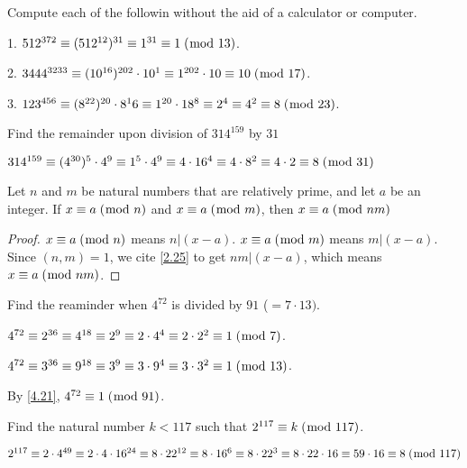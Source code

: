 \documentclass[../main.tex]{subfiles}
\begin{document}
\begin{ex} \label{4.19}
  Compute each of the followin without the aid of a calculator or computer.
\end{ex}

1. $512^{372} \equiv (512^{12})^{31} \equiv 1^{31} \equiv 1 \; (\bmod \; 13)$.

2. $3444^{3233} \equiv (10^{16})^{202} \cdot 10^1 \equiv 1^{202} \cdot 10 \equiv 10 \; (\bmod \; 17)$.

3. $123^{456} \equiv (8^{22})^{20} \cdot 8^16 \equiv 1^{20} \cdot 18^8 \equiv 2^4 \equiv 4^2 \equiv 8 \; (\bmod \; 23)$.



\begin{ex} \label{4.20}
  Find the remainder upon division of $314^{159}$ by $31$
\end{ex}

$314^{159} \equiv (4^{30})^5 \cdot 4^9 \equiv 1^5 \cdot 4^9 \equiv 4 \cdot 16^4 \equiv 4 \cdot 8^2 \equiv 4 \cdot 2 \equiv 8 \; (\bmod \; 31)$



\begin{thm} \label{4.21}
  Let $n$ and $m$ be natural numbers that are relatively prime, and let $a$ be an integer. If $x \equiv a \; (\bmod \; n)$ and $x \equiv a \; (\bmod \; m)$, then $x \equiv a \; (\bmod \; nm)$
\end{thm}

\begin{proof}
  $x \equiv a \; (\bmod \; n)$ means $n | (x-a)$. $x \equiv a \; (\bmod \; m)$ means $m | (x-a)$. Since $(n, m) = 1$, we cite \ref{2.25} to get $nm | (x-a)$, which means $x \equiv a \; (\bmod \; nm)$.
\end{proof}



\begin{ex} \label{4.22}
  Find the reaminder when $4^{72}$ is divided by $91$ ($= 7 \cdot 13)$.
\end{ex}

$4^{72} \equiv 2^{36} \equiv 4^{18} \equiv 2^9 \equiv 2 \cdot 4^4 \equiv 2 \cdot 2^2 \equiv 1 \; (\bmod \; 7)$.

$4^{72} \equiv 3^{36} \equiv 9^{18} \equiv 3^9 \equiv 3 \cdot 9^4 \equiv 3 \cdot 3^2 \equiv 1 \; (\bmod \; 13)$.

By \ref{4.21}, $4^{72} \equiv 1 \; (\bmod \; 91)$.



\begin{ex} \label{4.23}
  Find the natural number $k < 117$ such that $2^{117} \equiv k \; (\bmod \; 117)$.
\end{ex}

$2^{117} \equiv 2 \cdot 4^{49} \equiv 2 \cdot 4 \cdot 16^{24} \equiv 8 \cdot 22^{12} \equiv 8 \cdot 16^6 \equiv 8 \cdot 22^3 \equiv 8 \cdot 22 \cdot 16 \equiv 59 \cdot 16 \equiv 8 \; (\bmod \; 117)$
\end{document}
